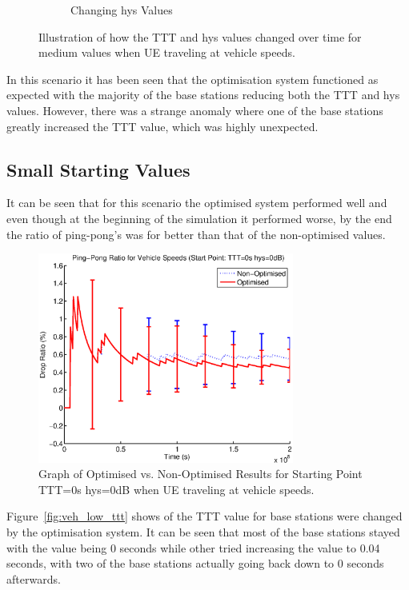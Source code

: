 \begin{figure}[H]
\begin{subfigure}[b]{0.49\textwidth}
                \caption{Changing hys Values}
                \label{fig:veh_mid_hys}
        \end{subfigure}
        \caption{Illustration of how the TTT and hys values changed over time for medium values when UE traveling at vehicle speeds.}\label{fig:veh_mid_ttthys}
\end{figure}
In this scenario it has been seen that the optimisation system functioned as expected with the majority of the base stations reducing both the TTT and hys values. However, there was a strange anomaly where one of the base stations greatly increased the TTT value, which was highly unexpected. 
\subsection{Small Starting Values}
It can be seen that for this scenario the optimised system performed well and even though at the beginning of the simulation it performed worse, by the end the ratio of ping-pong's was for better than that of the non-optimised values.
\begin{figure}[H]
  \begin{center}
    	  \includegraphics[width=0.75\textwidth]{figures/vehicle_figures/vehlow.eps}
    \end{center}
    \caption{Graph of Optimised vs. Non-Optimised Results for Starting Point TTT=0s hys=0dB when UE traveling at vehicle speeds.}
    \label{fig:veh_low_drop}
\end{figure}
Figure~\ref{fig:veh_low_ttt} shows of the TTT value for base stations were changed by the optimisation system. It can be seen that most of the base stations stayed with the value being 0 seconds while other tried increasing the value to 0.04 seconds, with two of the base stations actually going back down to 0 seconds afterwards.

